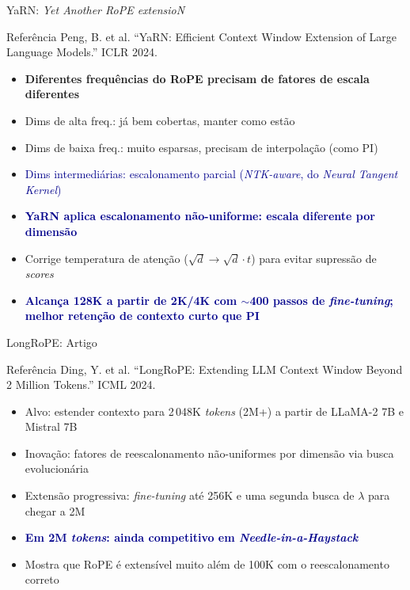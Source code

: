 \documentclass[aspectratio=169, xcolor=dvipsnames]{beamer}
\begin{document}
  \begin{frame}{YaRN: \textit{Yet Another RoPE extensioN}}
    \begin{exampleblock}{Referência}
      Peng, B. et al. ``YaRN: Efficient Context Window Extension of Large Language Models.'' ICLR 2024.
    \end{exampleblock}

    \begin{itemize}
      \item \textbf{Diferentes frequências do RoPE precisam de fatores de escala diferentes}
      \item Dims de alta freq.: já bem cobertas, manter como estão
      \item Dims de baixa freq.: muito esparsas, precisam de interpolação (como PI)
      \item \textcolor{DarkBlue}{Dims intermediárias: escalonamento parcial (\textit{NTK-aware}, do \textit{Neural Tangent Kernel})}
      \item \textcolor{DarkBlue}{\textbf{YaRN aplica escalonamento não-uniforme: escala diferente por dimensão}}
      \item Corrige temperatura de atenção ($\sqrt{d} \to \sqrt{d} \cdot t$) para evitar supressão de \textit{scores}
      \item \textcolor{DarkBlue}{\textbf{Alcança 128K a partir de 2K/4K com $\sim$400 passos de \textit{fine-tuning}; melhor retenção de contexto curto que PI}}
    \end{itemize}
  \end{frame}

  \begin{frame}{LongRoPE: Artigo}
    \begin{block}{Referência}
      Ding, Y. et al. ``LongRoPE: Extending LLM Context Window Beyond 2 Million Tokens.'' ICML 2024.
    \end{block}
    \begin{itemize}
      \item Alvo: estender contexto para 2\,048K \textit{tokens} (2M+) a partir de LLaMA-2 7B e Mistral 7B
      \item Inovação: fatores de reescalonamento não-uniformes por dimensão via busca evolucionária
      \item Extensão progressiva: \textit{fine-tuning} até 256K e uma segunda busca de $\lambda$ para chegar a 2M
      \item \textcolor{DarkBlue}{\textbf{Em 2M \textit{tokens}: ainda competitivo em \textit{Needle-in-a-Haystack}}}
      \item Mostra que RoPE é extensível muito além de 100K com o reescalonamento correto
    \end{itemize}
  \end{frame}
\end{document}
